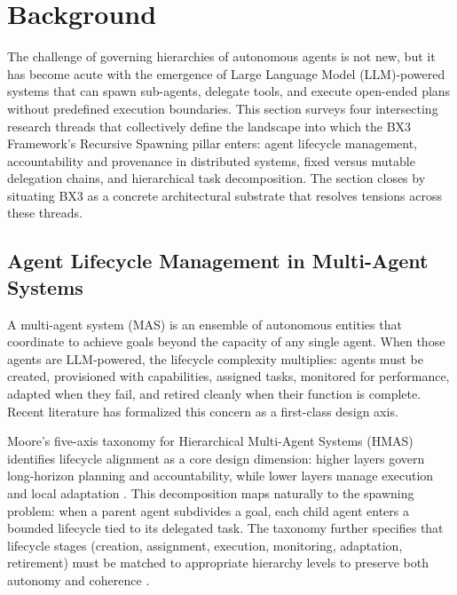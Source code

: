 \section{Background}
\label{sec:background}

The challenge of governing hierarchies of autonomous agents is not new, but it has become acute with the emergence of Large Language Model (LLM)-powered systems that can spawn sub-agents, delegate tools, and execute open-ended plans without predefined execution boundaries. This section surveys four intersecting research threads that collectively define the landscape into which the BX3 Framework's Recursive Spawning pillar enters: agent lifecycle management, accountability and provenance in distributed systems, fixed versus mutable delegation chains, and hierarchical task decomposition. The section closes by situating BX3 as a concrete architectural substrate that resolves tensions across these threads.

\subsection{Agent Lifecycle Management in Multi-Agent Systems}

A multi-agent system (MAS) is an ensemble of autonomous entities that coordinate to achieve goals beyond the capacity of any single agent. When those agents are LLM-powered, the lifecycle complexity multiplies: agents must be created, provisioned with capabilities, assigned tasks, monitored for performance, adapted when they fail, and retired cleanly when their function is complete. Recent literature has formalized this concern as a first-class design axis.

Moore's five-axis taxonomy for Hierarchical Multi-Agent Systems (HMAS) identifies lifecycle alignment as a core design dimension: higher layers govern long-horizon planning and accountability, while lower layers manage execution and local adaptation \cite{moore2025hmas}. This decomposition maps naturally to the spawning problem: when a parent agent subdivides a goal, each child agent enters a bounded lifecycle tied to its delegated task. The taxonomy further specifies that lifecycle stages (creation, assignment, execution, monitoring, adaptation, retirement) must be matched to appropriate hierarchy levels to preserve both autonomy and coherence \cite{moore2025hmas}.


